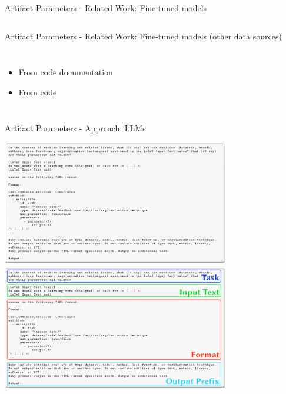 \documentclass[en,16:9,smallfoot]{sdqbeamer}
\begin{document}
\begin{frame}{Artifact Parameters - Related Work: Fine-tuned models}
\begin{columns}
   \end{columns}
   \end{frame}

   \begin{frame}{Artifact Parameters - Related Work: Fine-tuned models (other data sources)}
   \begin{columns}
           \begin{itemize}
               \item From code documentation~\cite{Baudart2020}
               \item From code~\cite{RakAmnouykit2021}
           \end{itemize}
           \ 
   \end{columns}
   \end{frame}

   \begin{frame}{Artifact Parameters - Approach: LLMs}
      \begin{overprint}
           \centering\includegraphics[width=0.75\textwidth]{imgs/prompt}
          \onslide<2> \centering\includegraphics[width=0.75\textwidth]{imgs/prompt_marked}
      \end{overprint}
   \end{frame}
\end{document}
